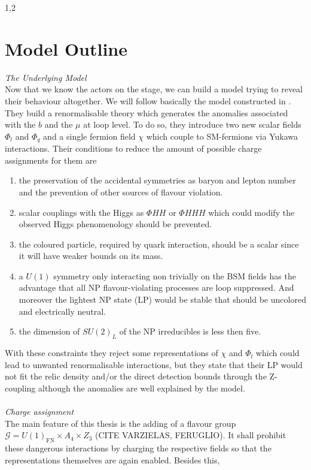 \documentclass[11pt,a4paper,twoside]{article}
\begin{document}
\begin{spacing}{1,2}
\section{Model Outline}
\textit{The Underlying Model}\\
\noindent Now that we know the actors on the stage, we can build a model trying to reveal their behaviour altogether. We will follow basically the model constructed
in \cite{Grip}. They build a renormalisable theory which generates the anomalies associated with the $b$ and the $\mu$ at loop level. To do so, they 
introduce two new scalar fields $\Phi_l$ and $\Phi_q$ and a single fermion field $\chi$ which couple to SM-fermions via Yukawa interactions. 
Their conditions to reduce the amount of possible charge assignments for them are 
\begin{enumerate}
 \item the preservation of the accidental symmetries as baryon and lepton number and the prevention of other sources of flavour violation.
 \item scalar couplings with the Higgs as $\Phi H H$ or $\Phi H H H$ which could modify the observed Higgs phenomenology should be prevented.
 \item the coloured particle, required by quark interaction, should be a scalar since it will have weaker bounds on its mass.
 \item a $U(1)$ symmetry only interacting non trivially on the BSM fields has the advantage that all NP flavour-violating processes are loop suppressed. And
 moreover the lightest NP state (LP) would be stable that should be uncolored and electrically neutral. 
 \item the dimension of $SU(2)_L$ of the NP irreducibles is less then five.
\end{enumerate}
With these constraints they reject some representations of $\chi$ and $\Phi_l$ which could lead to unwanted renormalisable interactions, but they state 
that their LP would not fit the relic density and/or the direct detection bounds through the Z-coupling although the anomalies are 
well explained by the model. \\ \\
\noindent \textit{Charge assignment}\\ \noindent
The main feature of this thesis is the adding of a flavour group $\mathcal{G} = U(1)_\text{FN}\times A_4 \times Z_3$ (CITE VARZIELAS, FERUGLIO). 
It shall prohibit these dangerous interactions by charging the respective fields so that the representations themselves are again enabled. Besides this,

\end{spacing}
\end{document}
